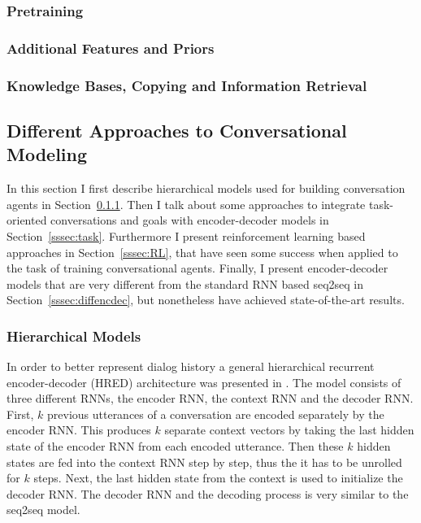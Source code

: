 \documentclass[12pt]{article}
\begin{document}
\subsubsection{Pretraining} \label{sssec:pretrain}
\subsubsection{Additional Features and Priors} \label{sssec:priors}

\subsubsection{Knowledge Bases, Copying and Information Retrieval} \label{sssec:KB}
\subsection{Different Approaches to Conversational Modeling} \label{ssec:33}
In this section I first describe hierarchical models used for building conversation agents in Section~\ref{sssec:HRED}. Then I talk about some approaches to integrate task-oriented conversations and goals with encoder-decoder models in Section~\ref{sssec:task}. Furthermore I present reinforcement learning based approaches in Section~\ref{sssec:RL}, that have seen some success when applied to the task of training conversational agents. Finally, I present encoder-decoder models that are very different from the standard RNN based seq2seq in Section~\ref{sssec:diffencdec}, but nonetheless have achieved state-of-the-art results.

\subsubsection{Hierarchical Models} \label{sssec:HRED}
In order to better represent dialog history a general hierarchical recurrent encoder-decoder (HRED) architecture was presented in \cite{Serban:2015}. The model consists of three different RNNs, the encoder RNN, the context RNN and the decoder RNN. First, \(k\) previous utterances of a conversation are encoded separately by the encoder RNN. This produces \(k\) separate context vectors by taking the last hidden state of the encoder RNN from each encoded utterance. Then these \(k\) hidden states are fed into the context RNN step by step, thus the it has to be unrolled for \(k\) steps. Next, the last hidden state from the context is used to initialize the decoder RNN. The decoder RNN and the decoding process is very similar to the seq2seq model.
\end{document}
